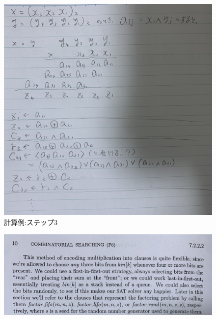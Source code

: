\documentclass[dvipdfmx,a4paper,12pt]{jsarticle}
\begin{document}
\newpage
\begin{figure}[htbp]
  \centering
  \includegraphics[width=130mm]{images/IMG_7409.jpg}
  \caption{計算例:ステップ3}
\end{figure}
\newpage
\begin{figure}[htbp]
  \centering
  \includegraphics[width=130mm]{images/IMG_7381.jpg}
\end{figure}
\end{document}
